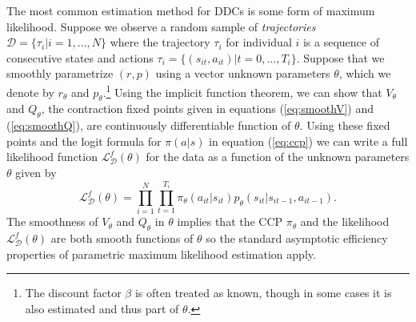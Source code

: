 The most common estimation method for DDCs is some form of  maximum likelihood.
Suppose we observe a random sample of {\it trajectories\/} $\mathcal{D}=\{\tau_i|i=1,\ldots,N\}$ 
where the trajectory $\tau_i$ for individual $i$ is a sequence of consecutive states and actions 
$\tau_i=\{(s_{it},a_{it})|t=0,\ldots,T_i\}$. Suppose  
that we smoothly parametrize $(r,p)$ using a vector unknown parameters $\theta$, which we denote by
$r_\theta$ and $p_\theta$.\footnote{\footnotesize
The discount factor  $\beta$ is often treated as known, though in 
some cases it is also estimated and thus part of $\theta$.}  
Using the implicit function theorem, we can show that $V_\theta$ and $Q_\theta$, the contraction fixed points given in equations
(\ref{eq:smoothV}) and (\ref{eq:smoothQ}), are continuously differentiable function of $\theta$.
Using these fixed points and the logit formula for $\pi(a|s)$ in equation (\ref{eq:ccp}) we can  write a full  likelihood
function $\mathcal{L}^f_{\mathcal{D}}(\theta)$ for the data as a function of the unknown parameters $\theta$ given by
\begin{equation}
    \mathcal{L}^f_{\mathcal{D}}(\theta) = \prod_{i=1}^N \prod_{t=1}^{T_i}  \pi_\theta(a_{it}|s_{it})p_\theta(s_{it}|s_{it-1},a_{it-1}).
\label{eq:lf}
\end{equation}
The smoothness of $V_\theta$ and $Q_\theta$ in $\theta$ implies that the CCP $\pi_\theta$ and the
likelihood $\mathcal{L}^f_{\mathcal{D}}(\theta)$ are both smooth functions of $\theta$ so the standard asymptotic
efficiency properties of parametric maximum likelihood estimation apply. 

